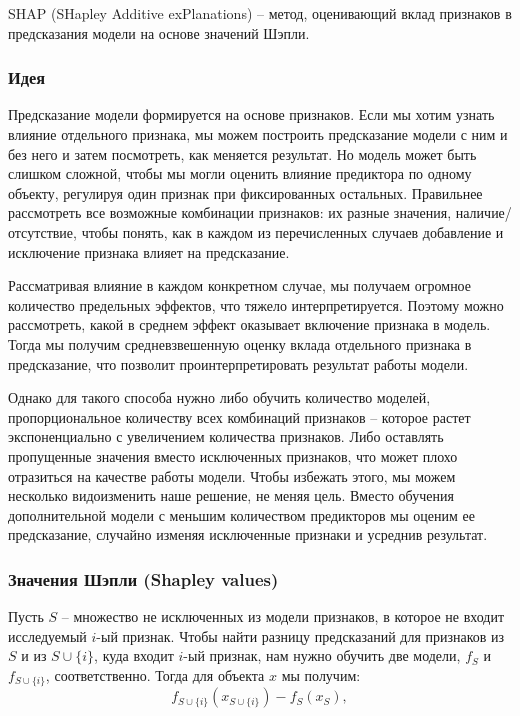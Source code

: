 SHAP (SHapley Additive exPlanations) -- метод, оценивающий вклад признаков в предсказания модели на основе значений Шэпли.

\subsubsection{Идея}
Предсказание модели формируется на основе признаков. Если мы хотим узнать влияние отдельного признака, мы можем построить предсказание модели с ним и без него и затем посмотреть, как меняется результат. %
Но модель может быть слишком сложной, чтобы мы могли оценить влияние предиктора по одному объекту, регулируя один признак при фиксированных остальных. %
Правильнее рассмотреть все возможные комбинации признаков: их разные значения, наличие/отсутствие, чтобы понять, как в каждом из перечисленных случаев добавление и исключение признака влияет на предсказание.

Рассматривая влияние в каждом конкретном случае, мы получаем огромное количество предельных эффектов, что тяжело интерпретируется. Поэтому можно рассмотреть, какой в среднем эффект оказывает включение признака в модель. Тогда мы получим средневзвешенную оценку вклада отдельного признака в предсказание, что позволит проинтерпретировать результат работы модели.

Однако для такого способа нужно либо обучить количество моделей, пропорциональное количеству всех комбинаций признаков -- которое растет экспоненциально с увеличением количества признаков. Либо оставлять пропущенные значения вместо исключенных признаков, что может плохо отразиться на качестве работы модели. Чтобы избежать этого, мы можем несколько видоизменить наше решение, не меняя цель. Вместо обучения дополнительной модели с меньшим количеством предикторов мы оценим ее предсказание, случайно изменяя исключенные признаки и усреднив результат.


\subsubsection{Значения Шэпли (Shapley values)}
Пусть $S$ -- множество не исключенных из модели признаков, в которое не входит исследуемый $i$-ый признак. Чтобы найти разницу предсказаний для признаков из $S$ и из $S \cup \{i\}$, куда входит $i$-ый признак, нам нужно обучить две модели, $f_S$ и $f_{S \cup \{i\}}$, соответственно. Тогда для объекта $x$ мы получим:
\[
f_{S \cup \{i\}}(x_{S \cup \{i\}}) - f_S(x_S),
\]

